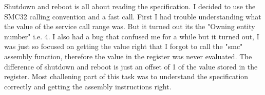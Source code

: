 Shutdown and reboot is all about reading the specification. I decided to use the
SMC32 calling convention and a fast call. First I had trouble understanding what
the value of the service call range was. But it turned out its the "Owning
entity number" i.e. 4. I also had a bug that confused me for a while but it
turned out, I was just so focused on getting the value right that I forgot to
call the "smc" assembly function, therefore the value in the register was never
evaluated.  The difference of shutdown and reboot is just an offset of 1 of the
value stored in the register.  Most challening part of this task was to
understand the specification correctly and getting the assembly instructions
right.
